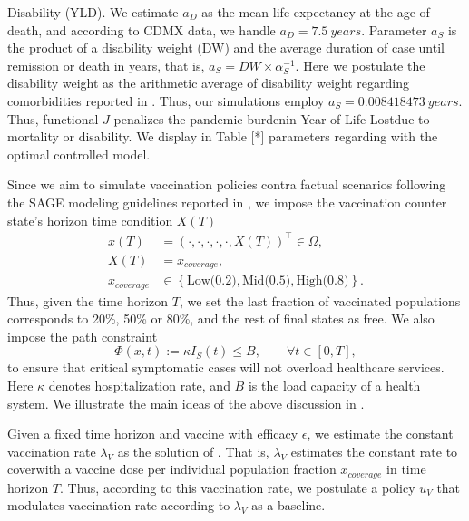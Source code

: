 Disability (YLD). We estimate $a_D$ as the mean life expectancy at the age of
death, and according to CDMX data, we handle $a_D = \SI{7.5}{years}$.
Parameter $a_S$ is the product of a disability weight (DW) and the average
duration of case until remission or death in years, that is,
$
a_S = DW \times \alpha_S^{-1}
$.
Here we postulate the disability weight as the arithmetic average of disability
weight regarding comorbidities reported in \cite{Jo2020}. Thus, our simulations
employ $a_S= \SI{0.008418473}{years}$.
%
Thus, functional $J$ penalizes the pandemic burden\textemdash in Year
of Life Lost\textemdash due to mortality or disability. We display in
Table [*] parameters regarding with the optimal controlled model.

Since we aim to simulate vaccination policies contra factual scenarios
following the SAGE modeling guidelines reported in \cite{sage2020},
we impose the vaccination counter state's horizon time condition $X(T)$
\begin{equation}
    \label{eqn:coverage_constrain}
    \begin{aligned}
        x(T) &=
            (\cdot, \cdot, \cdot, \cdot, \cdot, X(T))^{\top}
            \in \Omega,
        \\
        X(T)
        &= x_{cover age},
        \\
        x_{coverage}
        & \in
        \left \{
        \text{Low(0.2)},\text{Mid(0.5)}, \text{High(0.8)}
        \right \} .
    \end{aligned}
\end{equation}
Thus, given the time horizon $T$, we set the last fraction of
vaccinated populations corresponds to 20\%, 50\% or 80\%, and  the rest of
final states as free. We also impose the path constraint
\begin{equation}
    \label{eqn:path_constrain}
    \Phi(x,t):= \kappa I_S(t) \leq B,
    \qquad \forall t \in [0, T],
\end{equation}
to ensure that critical symptomatic cases
will not overload healthcare services. Here $\kappa$
denotes hospitalization rate, and $B$ is the load capacity of a
health system. We illustrate the main ideas of the above discussion
in .

Given a fixed time horizon and vaccine with efficacy $\epsilon$,
we estimate the constant vaccination rate $\lambda_V$ as the solution of
.
That is, $\lambda_V$ estimates the constant rate
to cover\textemdash with a vaccine dose per individual\textemdash
population fraction $x_{coverage}$ in time horizon $T$.
Thus, according to this vaccination rate, we postulate a policy $u_V$ that
modulates vaccination rate according to $\lambda_V$ as a baseline.

